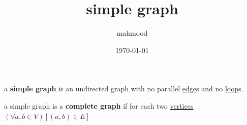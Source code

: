 \documentclass[a4paper,12pt]{article}
\author{mahmood}
\date{\today}
\title{simple graph}
\begin{document}
\maketitle
\begin{definition}
a \textbf{simple graph} is an undirected graph with no parallel \href{20230314001632-edge.org}{edge}s and no \href{20230314010702-loop.org}{loop}s.\\
\end{definition}
\begin{characteristic}
a simple graph is a \textbf{complete graph} if for each two \href{20230314001051-graph.org}{vertices} \((\forall a,b \in V)[(a,b) \in E]\)\\
\end{characteristic}
\end{document}
